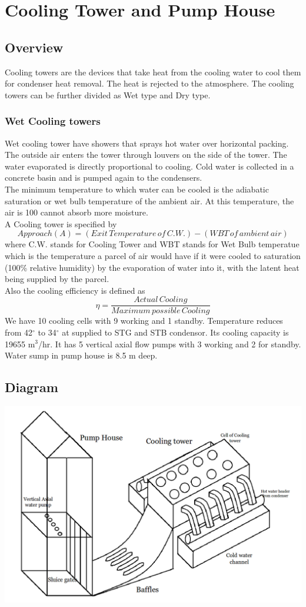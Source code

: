 \documentclass[english,11pt]{report}
\begin{document}
\chapter{Cooling Tower and Pump House}
\section{Overview}
Cooling towers are the devices that take heat from the cooling water to cool them for condenser heat removal. The heat is rejected to the atmosphere. The cooling towers can be further divided as Wet type and Dry type.
\subsection{Wet Cooling towers}
Wet cooling tower have showers that sprays hot water over horizontal packing. The outside
air enters the tower through louvers on the side of the tower. The water evaporated is
directly proportional to cooling. Cold water is collected in a concrete basin and is pumped
again to the condensers.\\[1em]
The minimum temperature to which water can be cooled is the adiabatic saturation or wet
bulb temperature of the ambient air. At this temperature, the air is 100 %
cannot absorb more moisture.\\[1em]
A Cooling tower is specified by
$$Approach(A) = (Exit \,Temperature \,of \,C.W.) - (WBT \,of \,ambient \,air)$$
where C.W. stands for Cooling Tower and WBT stands for Wet Bulb temperatue which is the temperature a parcel of air would have if it were cooled to saturation (100\% relative humidity) by the evaporation of water into it, with the latent heat being supplied by the parcel.\\[1em]
Also the cooling efficiency is defined as
$$\eta = \frac{Actual \,Cooling}{Maximum \,possible \,Cooling}$$
We have 10 cooling cells with 9 working and 1 standby. Temperature reduces from 42$^{\circ}$ to 34$^{\circ}$ at supplied to STG and STB condensor. Its cooling capacity is 19655 m$^3$/hr. It has 5 vertical axial flow pumps with 3 working and 2 for standby. Water sump in pump house is 8.5 m deep.
\section{Diagram}
\includegraphics[width =6in]{cooling}
\end{document}
